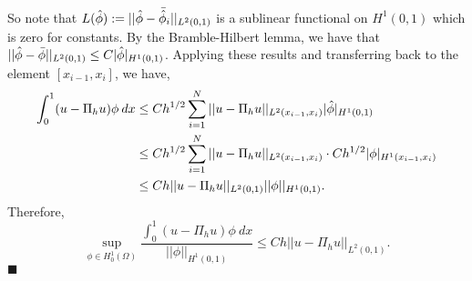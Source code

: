 \documentclass[11pt]{article}
\begin{document}
So note that $L(\Hat{\phi}) := ||\Hat{\phi} - \Bar{\Hat{\phi}}_i||_{L^2(0,1)}$ is a sublinear functional on $H^1(0,1)$ which is zero for constants.
By the Bramble-Hilbert lemma, we have that $||\Hat{\phi} - \Bar{\phi}||_{L^2(0,1)} \leq C|\Hat{\phi}|_{H^1(0,1)}$.
Applying these results and transferring back to the element $[x_{i-1},x_i]$, we have,
\begin{align*}
    \int_0^1 (u - \Pi_h u) \phi \: dx &\leq C h^{1/2} \sum_{i=1}^N ||u - \Pi_h u||_{L^2(x_{i-1}, x_i)} |\Hat{\phi}|_{H^1(0,1)} \\
    &\leq C h^{1/2} \sum_{i=1}^N ||u - \Pi_h u||_{L^2(x_{i-1}, x_i)} \cdot C h^{1/2} |\phi|_{H^1(x_{i-1}, x_i)} \\
    &\leq Ch ||u - \Pi_h u||_{L^2(0,1)} ||\phi||_{H^1(0,1)}.
\end{align*}
Therefore,
\begin{equation*}
    \sup_{\phi \in H^1_0(\Omega)} \frac{\int_0^1 (u - \Pi_h u) \phi \: dx}{||\phi||_{H^1(0,1)}}  \leq Ch ||u - \Pi_h u||_{L^2(0,1)}.
\end{equation*}
$\blacksquare$
\end{document}
